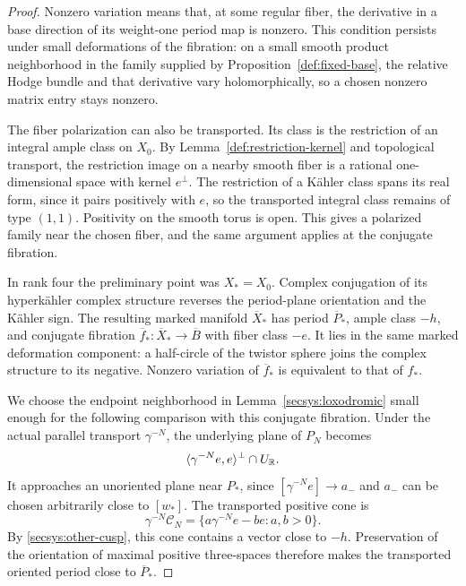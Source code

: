 \begin{proof}
Nonzero variation means that, at some regular fiber, the derivative
in a base direction of its weight-one period map is nonzero.  This
condition persists under small deformations of the fibration: on a
small smooth product neighborhood in the family supplied by
Proposition~\ref{def:fixed-base}, the relative Hodge bundle and that
derivative vary holomorphically, so a chosen nonzero matrix entry
stays nonzero.

The fiber polarization can also be transported.  Its class is the
restriction of an integral ample class on $X_0$.  By
Lemma~\ref{def:restriction-kernel} and topological transport, the
restriction image on a nearby smooth fiber is a rational
one-dimensional space with kernel $e^\perp$.  The restriction of a
K\"ahler class spans its real form, since it pairs positively with $e$,
so the transported integral class
remains of type $(1,1)$.  Positivity on the smooth torus is open.
This gives a polarized family near the chosen fiber, and the same
argument applies at the conjugate fibration.

In rank four the preliminary point was $X_*=X_0$.  Complex
conjugation of its hyperk\"ahler complex structure reverses the
period-plane orientation and the K\"ahler sign.  The resulting marked
manifold $\overline X_*$ has period $\overline P_*$, ample class $-h$,
and conjugate fibration
$\overline f_*:\overline X_*\to\overline B$ with fiber class $-e$.
It lies in the same marked deformation component: a half-circle of
the twistor sphere joins the complex structure to its negative.
Nonzero variation of $\overline f_*$ is equivalent to that of $f_*$.

We choose the endpoint neighborhood in
Lemma~\ref{secsys:loxodromic} small enough for the following comparison
with this conjugate fibration.  Under the actual parallel transport
$\gamma^{-N}$, the underlying plane of $P_N$ becomes
\[
           \langle \gamma^{-N}e,e\rangle^\perp\cap U_{\mathbb R}.
\]
It approaches an unoriented plane near $P_*$, since
$[\gamma^{-N}e]\to a_-$ and $a_-$ can be chosen arbitrarily close to
$[w_*]$.  The transported positive cone is
\begin{equation}\label{secsys:opposite-cone}
        \gamma^{-N}\mathcal C_N
             =\{a\gamma^{-N}e-b e:a,b>0\}.
\end{equation}
By \eqref{secsys:other-cusp}, this cone contains a vector close to
$-h$.  Preservation of the orientation of maximal positive
three-spaces therefore makes the transported oriented period close
to $\overline P_*$.


\end{proof}
